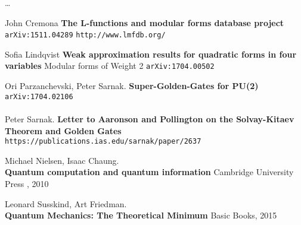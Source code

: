 \documentclass[12pt]{article}
\begin{document}
\newpage

\noindent \dots


\selectfont \fontsize{12}{10}\selectfont

\begin{thebibliography}{}

\item John Cremona \textbf{The L-functions and modular forms database project}  \texttt{arXiv:1511.04289}  
\texttt{http://www.lmfdb.org/}

\item Sofia Lindqvist \textbf{Weak approximation results for quadratic forms in four variables} Modular forms of Weight 2 \texttt{arXiv:1704.00502}

\item Ori Parzanchevski, Peter Sarnak.  \textbf{Super-Golden-Gates for PU(2)} \texttt{arXiv:1704.02106} \\ \\
Peter Sarnak.  \textbf{Letter to Aaronson and Pollington on the Solvay-Kitaev Theorem and Golden Gates} \texttt{https://publications.ias.edu/sarnak/paper/2637}

\item Michael Nielsen, Isaac Chaung. \\ \textbf{Quantum computation and quantum information}  Cambridge University Press , 2010

\item Leonard Susskind, Art Friedman. \\ \textbf{Quantum Mechanics: The Theoretical Minimum} Basic Books, 2015
\end{thebibliography}
\end{document}
